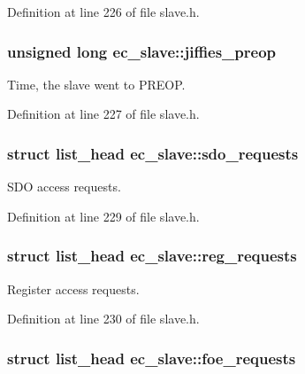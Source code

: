 Definition at line 226 of file slave.\-h.

\subsubsection[{jiffies\-\_\-preop}]{\setlength{\rightskip}{0pt plus 5cm}unsigned long ec\-\_\-slave\-::jiffies\-\_\-preop}\label{structec__slave_af177795f6287be576f617772d18e3dee}


Time, the slave went to P\-R\-E\-O\-P. 



Definition at line 227 of file slave.\-h.

\subsubsection[{sdo\-\_\-requests}]{\setlength{\rightskip}{0pt plus 5cm}struct list\-\_\-head ec\-\_\-slave\-::sdo\-\_\-requests}\label{structec__slave_a6cbec4e34923f5b25fecdbd166a8328a}


S\-D\-O access requests. 



Definition at line 229 of file slave.\-h.

\subsubsection[{reg\-\_\-requests}]{\setlength{\rightskip}{0pt plus 5cm}struct list\-\_\-head ec\-\_\-slave\-::reg\-\_\-requests}\label{structec__slave_a614562e4df0afc3707515ae9f1df0ffc}


Register access requests. 



Definition at line 230 of file slave.\-h.

\subsubsection[{foe\-\_\-requests}]{\setlength{\rightskip}{0pt plus 5cm}struct list\-\_\-head ec\-\_\-slave\-::foe\-\_\-requests}\label{structec__slave_a374ce6a1879d81ca54496be994b9e46e}


